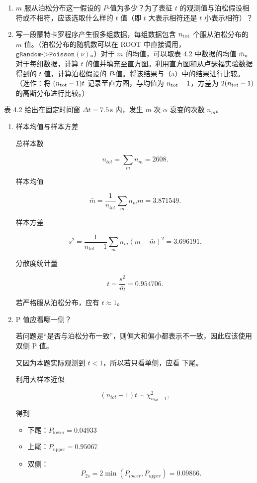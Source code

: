 \begin{question}
\begin{enumerate}
\item \(m\) 服从泊松分布这一假设的 \(P\)-值为多少？为了表征 \(t\)
的观测值与泊松假设相符或不相符，应该选取什么样的 \(t\) 值（即 \(t\)
大表示相符还是 \(t\) 小表示相符）？

\item 写一段蒙特卡罗程序产生很多组数据，每组数据包含 \(n_{\rm tot}\)
个服从泊松分布的 \(m\) 值。（泊松分布的随机数可以在 ROOT
中直接调用，\(\texttt{gRandom->Poisson}(\nu)\)。）对于 \(m\)
的均值，可以取表 4.2 中数据的均值 \(\bar m\)。对于每组数据，计算 \(t\)
的值并填充至直方图。利用直方图和从卢瑟福实验数据得到的 \(t\)
值，计算泊松假设的 \(P\)-值。将该结果与（a）中的结果进行比较。（选作：将
\((n_{\rm tot}-1)t\) 记录至直方图，与均值为 \(n_{\rm tot}-1\)，方差为
\(2(n_{\rm tot}-1)\) 的高斯分布进行比较。）
\end{enumerate}
\begin{solution}
表 4.2 给出在固定时间窗 \(\Delta t=7.5\,\mathrm{s}\) 内，发生 \(m\) 次
\(\alpha\) 衰变的次数 \(n_m\)。

\begin{enumerate}
\item 样本均值与样本方差

总样本数

\[
n_{tot} = \sum_m n_m = 2608.
\]

样本均值

\[
\bar m = \frac{1}{n_{tot}}\sum_m n_m m = 3.871549.
\]

样本方差

\[
s^2 = \frac{1}{n_{tot}-1}\sum_m n_m (m-\bar m)^2 = 3.696191.
\]

分散度统计量

\[
t=\frac{s^2}{\bar m}=0.954706.
\]

若严格服从泊松分布，应有 \(t\approx 1\)。

\item P 值应看哪一侧？

若问题是``是否与泊松分布一致''，则偏大和偏小都表示不一致，因此应该使用
双侧 P 值。

又因为本题实际观测到 \(t<1\)，所以若只看单侧，应看 下尾。

利用大样本近似

\[
(n_{tot}-1)t \sim \chi^2_{n_{tot}-1},
\]

得到

\begin{itemize}
\item
  下尾：\(P_{\mathrm{lower}}=0.04933\)
\item
  上尾：\(P_{\mathrm{upper}}=0.95067\)
\item
  双侧： \[
  P_{2s} = 2\min(P_{lower},P_{upper}) = 0.09866.
  \]
\end{itemize}


\end{enumerate}
\end{solution}
\end{question}
